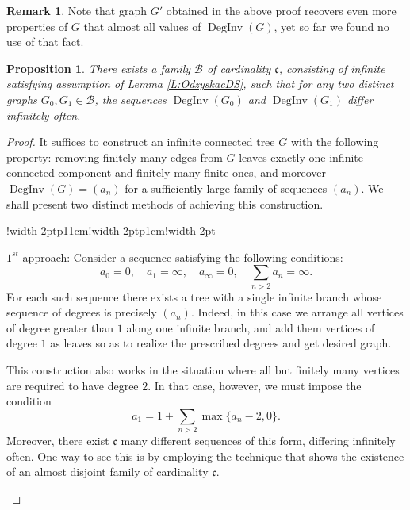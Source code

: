 \documentclass{amsart}
\newtheorem{prop}[theorem]{Proposition}
\theoremstyle{plain}
\theoremstyle{definition}
\newtheorem{rem}[theorem]{Remark}
\theoremstyle{remark}
\numberwithin{equation}{section}
\DeclareMathOperator{\ds}{DegInv}
\begin{document}
\begin{rem}
    Note that graph $G'$ obtained in the above proof recovers even more properties of $G$ that almost all values of $\ds(G)$, yet so far we found no use of that fact.
\end{rem}

\begin{prop}\label{P:Las}
There exists a family \(\mathcal{B}\) of cardinality \(\mathfrak{c}\), consisting of infinite satisfying assumption of Lemma \ref{L:OdzyskacDS}, such that for any two distinct graphs \(G_{0}, G_{1}\in\mathcal{B}\), the sequences \(\ds(G_{0})\) and \(\ds(G_{1})\) differ infinitely often.
\end{prop}
\begin{proof}
It suffices to construct an infinite connected tree \(G\) with the following property:  
removing finitely many edges from \(G\) leaves exactly one infinite connected component and finitely many finite ones,  
and moreover \(\ds(G)=(a_{n})\) for a sufficiently large family of sequences \((a_{n})\).  
We shall present two distinct methods of achieving this construction.





\begin{center}

\begin{tabular}{!{\color{white}\vrule width 2pt}p{11cm}!{\color{white}\vrule width 2pt}p{1cm}!{\color{white}\vrule width 2pt}}
\vspace{-170pt} 

$1^{st}$ approach:
Consider a sequence satisfying the following conditions:
\[
a_{0}=0, \quad a_{1}=\infty, \quad a_{\infty}=0, \quad \sum_{n>2} a_{n}=\infty.
\]
For each such sequence there exists a tree with a single infinite branch whose sequence of degrees is precisely \((a_{n})\). Indeed, in this case we arrange all vertices of degree greater than \(1\) along one infinite branch, and add them vertices of degree \(1\) as leaves so as to realize the prescribed degrees and get desired graph.

This construction also works in the situation where all but finitely many vertices are required to have degree \(2\). In that case, however, we must impose the condition
\vspace{-7pt}
\[
a_{1}=1+\sum_{n>2}\max\{a_{n}-2,0\}.
\]
Moreover, there exist \(\mathfrak{c}\) many different sequences of this form, differing infinitely often. One way to see this is by employing the technique that shows the existence of an almost disjoint family of cardinality \(\mathfrak{c}\).


\end{tabular}
\end{center}
\end{proof}
\end{document}
